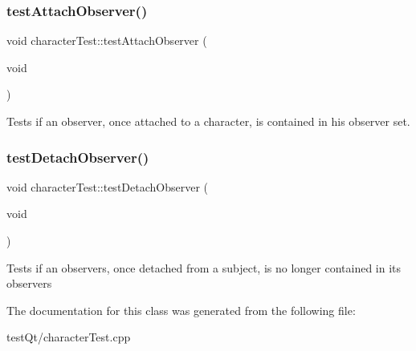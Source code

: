 \subsubsection{\texorpdfstring{test\+Attach\+Observer()}{testAttachObserver()}}
{\footnotesize\ttfamily void character\+Test\+::test\+Attach\+Observer (\begin{DoxyParamCaption}\item[{void}]{ }\end{DoxyParamCaption})\hspace{0.3cm}{\ttfamily [protected]}}

Tests if an observer, once attached to a character, is contained in his observer set. \hypertarget{classcharacter_test_a7afc2a1b8e1e2575d658877a86133e50}{}\label{classcharacter_test_a7afc2a1b8e1e2575d658877a86133e50} 
\subsubsection{\texorpdfstring{test\+Detach\+Observer()}{testDetachObserver()}}
{\footnotesize\ttfamily void character\+Test\+::test\+Detach\+Observer (\begin{DoxyParamCaption}\item[{void}]{ }\end{DoxyParamCaption})\hspace{0.3cm}{\ttfamily [protected]}}

Tests if an observers, once detached from a subject, is no longer contained in its observers 

The documentation for this class was generated from the following file\+:\begin{DoxyCompactItemize}
\item 
test\+Qt/character\+Test.\+cpp\end{DoxyCompactItemize}
